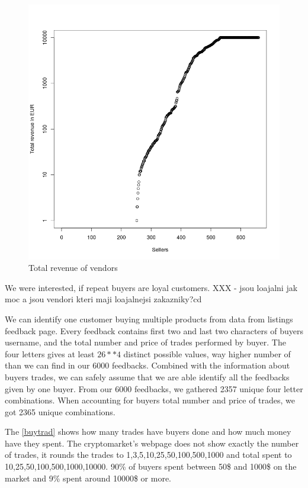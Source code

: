 \documentclass[
  digital, %
  table,   %
  lof,     %
  lot,     %
  oneside
]{fithesis3}
\begin{document}
\begin{figure}[!htb]
    \centering
    \includegraphics[scale=0.4]{total-rev}
    \caption{Total revenue of vendors}
    \label{Vendors by total revenue}
\end{figure}


We were interested, if repeat buyers are loyal customers.
XXX - jsou loajalni jak moc a jsou vendori kteri maji loajalnejsi zakazniky?cd 


We can identify one customer buying multiple products from data from listings feedback page.
Every feedback contains first two and last two characters of buyers username,
and the total number and price of trades performed by buyer.
The four letters gives at least $26**4$ distinct possible values, way higher number of 
than we can find in our 6000 feedbacks. Combined with the information
about buyers trades, we can safely assume that we are able identify
all the feedbacks given by one buyer.
From our 6000 feedbacks, we gathered 2357 unique four letter combinations.
When accounting for buyers total number and price of trades, we got 2365 unique combinations.

The \ref{buytrad} shows how many trades have buyers done and how much money have they spent.
The cryptomarket's webpage does not show exactly the number of trades, it rounds the trades
to 1,3,5,10,25,50,100,500,1000 and total spent to 10,25,50,100,500,1000,10000.
90\% of buyers spent between 50\$ and 1000\$ on the market and 9\% spent around 10000\$ or more.
\end{document}
